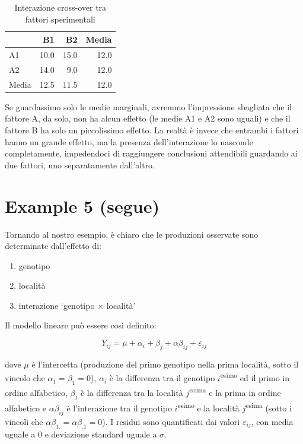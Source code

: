 \documentclass[
  12pt,
]{book}
\providecommand{\tightlist}{%
  \setlength{\itemsep}{0pt}\setlength{\parskip}{0pt}}
\begin{document}
\begin{table}

\caption{\label{tab:tabName4b6}Interazione cross-over tra fattori sperimentali}
\centering
\begin{tabular}[t]{lrrr}
\toprule
  & B1 & B2 & Media\\
\midrule
A1 & 10.0 & 15.0 & 12.0\\
A2 & 14.0 & 9.0 & 12.0\\
Media & 12.5 & 11.5 & 12.0\\
\bottomrule
\end{tabular}
\end{table}

Se guardassimo solo le medie marginali, avremmo l'impressione sbagliata che il fattore A, da solo, non ha alcun effetto (le medie A1 e A2 sono uguali) e che il fattore B ha solo un piccolissimo effetto. La realtà è invece che entrambi i fattori hanno un grande effetto, ma la presenza dell'interazione lo nasconde completamente, impedendoci di raggiungere conclusioni attendibili guardando ai due fattori, uno separatamente dall'altro.

\hypertarget{example-5-segue}{%
\section{Example 5 (segue)}\label{example-5-segue}}

Tornando al nostro esempio, è chiaro che le produzioni osservate sono determinate dall'effetto di:

\begin{enumerate}
\def\labelenumi{\arabic{enumi}.}
\tightlist
\item
  genotipo
\item
  località
\item
  interazione `genotipo \(\times\) località'
\end{enumerate}

Il modello lineare può essere così definito:

\[Y_{ij} = \mu + \alpha_i + \beta_j + \alpha\beta_{ij} + \varepsilon_{ij}\]

dove \(\mu\) è l'intercetta (produzione del primo genotipo nella prima località, sotto il vincolo che \(\alpha_1 = \beta_1 = 0\)), \(\alpha_i\) è la differenza tra il genotipo \(i\)\textsuperscript{esimo} ed il primo in ordine alfabetico, \(\beta_j\) è la differenza tra la località \(j\)\textsuperscript{esima} e la prima in ordine alfabetico e \(\alpha\beta_{ij}\) è l'interazione tra il genotipo \(i\)\textsuperscript{esimo} e la località \(j\)\textsuperscript{esima} (sotto i vincoli che \(\alpha\beta_{1.} = \alpha\beta_{.1} = 0\)). I residui sono quantificati dai valori \(\varepsilon_{ij}\), con media uguale a 0 e deviazione standard uguale a \(\sigma\).
\end{document}
